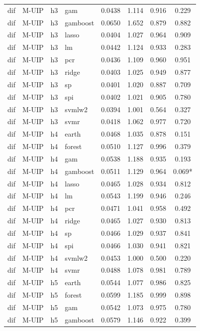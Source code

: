 \begin{ThreePartTable}
\begin{longtable}[t]{llclcccc}
dif & M-UIP & h3 & gam & 0.0438 & 1.114 & 0.916 & 0.229\\
dif & M-UIP & h3 & gamboost & 0.0650 & 1.652 & 0.879 & 0.882\\
dif & M-UIP & h3 & lasso & 0.0404 & 1.027 & 0.964 & 0.909\\
dif & M-UIP & h3 & lm & 0.0442 & 1.124 & 0.933 & 0.283\\
dif & M-UIP & h3 & pcr & 0.0436 & 1.109 & 0.960 & 0.951\\
dif & M-UIP & h3 & ridge & 0.0403 & 1.025 & 0.949 & 0.877\\
dif & M-UIP & h3 & sp & 0.0401 & 1.020 & 0.887 & 0.709\\
dif & M-UIP & h3 & spi & 0.0402 & 1.021 & 0.905 & 0.780\\
dif & M-UIP & h3 & svmlw2 & 0.0394 & 1.001 & 0.564 & 0.327\\
dif & M-UIP & h3 & svmr & 0.0418 & 1.062 & 0.977 & 0.720\\
\addlinespace
dif & M-UIP & h4 & earth & 0.0468 & 1.035 & 0.878 & 0.151\\
dif & M-UIP & h4 & forest & 0.0510 & 1.127 & 0.996 & 0.379\\
dif & M-UIP & h4 & gam & 0.0538 & 1.188 & 0.935 & 0.193\\
dif & M-UIP & h4 & gamboost & 0.0511 & 1.129 & 0.964 & 0.069*\\
dif & M-UIP & h4 & lasso & 0.0465 & 1.028 & 0.934 & 0.812\\
dif & M-UIP & h4 & lm & 0.0543 & 1.199 & 0.946 & 0.246\\
dif & M-UIP & h4 & pcr & 0.0471 & 1.041 & 0.958 & 0.492\\
dif & M-UIP & h4 & ridge & 0.0465 & 1.027 & 0.930 & 0.813\\
dif & M-UIP & h4 & sp & 0.0466 & 1.029 & 0.937 & 0.841\\
dif & M-UIP & h4 & spi & 0.0466 & 1.030 & 0.941 & 0.821\\
dif & M-UIP & h4 & svmlw2 & 0.0453 & 1.000 & 0.500 & 0.220\\
dif & M-UIP & h4 & svmr & 0.0488 & 1.078 & 0.981 & 0.789\\
\addlinespace
dif & M-UIP & h5 & earth & 0.0544 & 1.077 & 0.986 & 0.825\\
dif & M-UIP & h5 & forest & 0.0599 & 1.185 & 0.999 & 0.898\\
dif & M-UIP & h5 & gam & 0.0542 & 1.073 & 0.975 & 0.780\\
dif & M-UIP & h5 & gamboost & 0.0579 & 1.146 & 0.922 & 0.399\\

\end{longtable}
\end{ThreePartTable}
